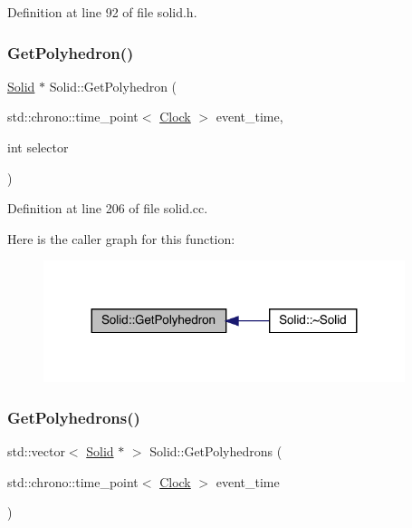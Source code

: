 Definition at line 92 of file solid.\+h.

\mbox{\label{class_solid_a256ecadf461f7232eb05c28b6b4b438a}} 
\subsubsection{\texorpdfstring{Get\+Polyhedron()}{GetPolyhedron()}}
{\footnotesize\ttfamily \hyperlink{class_solid}{Solid} $\ast$ Solid\+::\+Get\+Polyhedron (\begin{DoxyParamCaption}\item[{std\+::chrono\+::time\+\_\+point$<$ \hyperlink{universe_8h_a0ef8d951d1ca5ab3cfaf7ab4c7a6fd80}{Clock} $>$}]{event\+\_\+time,  }\item[{int}]{selector }\end{DoxyParamCaption})}



Definition at line 206 of file solid.\+cc.

Here is the caller graph for this function\+:
\nopagebreak
\begin{figure}[H]
\begin{center}
\leavevmode
\includegraphics[width=299pt]{class_solid_a256ecadf461f7232eb05c28b6b4b438a_icgraph}
\end{center}
\end{figure}
\mbox{\label{class_solid_a7006714c19bf8a7b020f42f394e4edc0}} 
\subsubsection{\texorpdfstring{Get\+Polyhedrons()}{GetPolyhedrons()}}
{\footnotesize\ttfamily std\+::vector$<$ \hyperlink{class_solid}{Solid} $\ast$ $>$ Solid\+::\+Get\+Polyhedrons (\begin{DoxyParamCaption}\item[{std\+::chrono\+::time\+\_\+point$<$ \hyperlink{universe_8h_a0ef8d951d1ca5ab3cfaf7ab4c7a6fd80}{Clock} $>$}]{event\+\_\+time }\end{DoxyParamCaption})}



